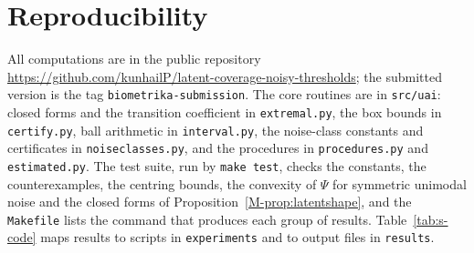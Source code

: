 \documentclass[11pt]{article}
\renewcommand{\_}{\usc\allowbreak}
\begin{document}
\section{Reproducibility}\label{sec:s-code}

All computations are in the public repository\\ \url{https://github.com/kunhailP/latent-coverage-noisy-thresholds}; the submitted version is the tag \texttt{biometrika-submission}. The core routines are in \texttt{src/uai}: closed forms and the transition coefficient in \texttt{extremal.py}, the box bounds in \texttt{certify.py}, ball arithmetic in \texttt{interval.py}, the noise-class constants and certificates in \texttt{noise\_classes.py}, and the procedures in \texttt{procedures.py} and \texttt{estimated.py}. The test suite, run by \texttt{make test}, checks the constants, the counterexamples, the centring bounds, the convexity of $\Psi$ for symmetric unimodal noise and the closed forms of Proposition~\ref{M-prop:latentshape}, and the \texttt{Makefile} lists the command that produces each group of results. Table~\ref{tab:s-code} maps results to scripts in \texttt{experiments} and to output files in \texttt{results}.
\end{document}
